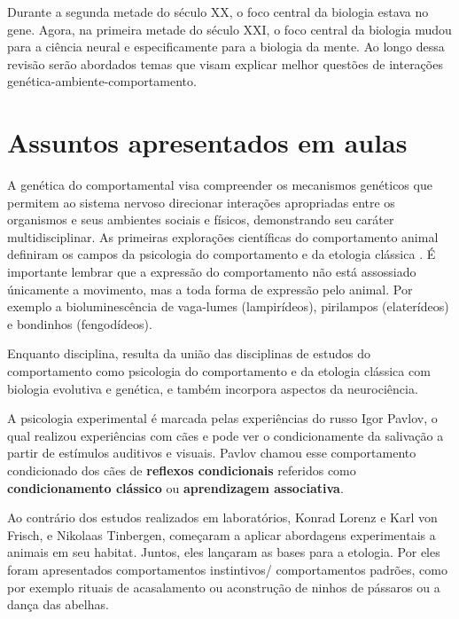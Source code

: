 \documentclass[
	article,			%
	12pt,				%
	oneside,			%
	a4paper,			%
	english,			%
	brazil,				%
	sumario=tradicional
	]{abntex2}
\begin{document}
Durante a segunda metade do século XX, o foco central da biologia estava no gene. Agora, na primeira metade do século XXI, o foco central da biologia mudou para a ciência neural e especificamente para a biologia da mente.
\cite{kandel2000principles} Ao longo dessa revisão serão abordados temas que visam explicar melhor questões de interações genética-ambiente-comportamento.
\section{Assuntos apresentados em aulas}
\label{aulas}
A genética do comportamental visa compreender os mecanismos genéticos que permitem ao sistema nervoso direcionar interações apropriadas entre os organismos e seus ambientes sociais e físicos, demonstrando seu caráter multidisciplinar.
As primeiras explorações científicas do comportamento animal definiram os campos da  psicologia do comportamento e da etologia clássica \cite{anholt2009principles}.
É importante lembrar que a expressão do comportamento não está assossiado únicamente a movimento, mas a toda forma de expressão pelo animal. Por exemplo a bioluminescência de vaga-lumes (lampirídeos), pirilampos (elaterídeos) e bondinhos (fengodídeos).


Enquanto disciplina, resulta da união das disciplinas de estudos do comportamento como  psicologia do comportamento e da etologia clássica com biologia evolutiva e genética, e também incorpora aspectos da neurociência.


A psicologia experimental é marcada pelas experiências do russo Igor Pavlov, o qual realizou experiências com cães e pode ver o condicionamente da salivação a partir de estímulos auditivos e visuais. Pavlov chamou esse comportamento condicionado dos cães de \textbf{reflexos condicionais} referidos como \textbf{condicionamento clássico} ou \textbf{aprendizagem associativa}.


Ao contrário dos estudos realizados em laboratórios, Konrad Lorenz e Karl von Frisch, e Nikolaas Tinbergen, começaram a aplicar abordagens experimentais a animais em seu habitat. Juntos, eles lançaram as bases para a etologia.%
Por eles foram apresentados comportamentos instintivos/ comportamentos padrões, como por exemplo rituais de acasalamento ou aconstrução de ninhos de pássaros ou a dança das abelhas.
\end{document}
